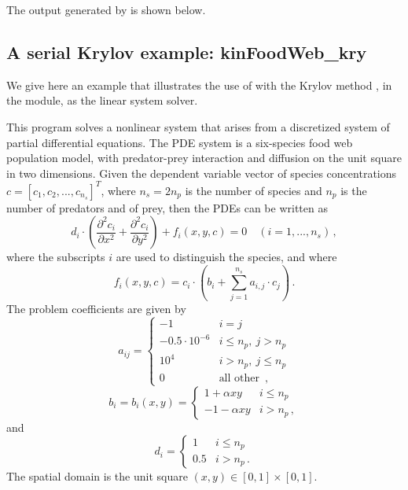 The output generated by  is shown below.




\subsection{A serial Krylov example: kinFoodWeb\_kry}\label{ss:kinFoodWeb_kry}

We give here an example that illustrates the use of {\kinsol} with the Krylov
method {\spgmr}, in the {\kinspgmr} module, as the linear system solver.

This program solves a nonlinear system that arises from a discretized system of partial
differential equations. The PDE system is a six-species food web population
model, with predator-prey interaction and diffusion on the unit square in
two dimensions. Given the dependent variable vector of species concentrations
$c = [c_1, c_2,..., c_{n_s}]^T$, where $n_s = 2 n_p$ is the number of species 
and $n_p$ is the number of predators and of prey, then
the PDEs can be written as
\begin{equation}\label{e:kinFoodWeb_kry_pde}
  d_i \cdot \left( \frac{\partial^2 c_i}{\partial x^2} + 
    \frac{\partial^2 c_i}{\partial y^2} \right) + f_i(x,y,c) = 0
  \quad (i=1,...,n_s) \, ,
\end{equation}
where the subscripts $i$ are used to distinguish the species, and where
\begin{equation}\label{e:kinFoodWeb_kry_fterm}
f_i(x,y,c) = c_i \cdot \left(b_i + \sum_{j=1}^{n_s} a_{i,j} \cdot c_j \right) \, .
\end{equation}
The problem coefficients are given by
\begin{equation*}
  a_{ij} = 
  \begin{cases}
    -1                 & i=j \\
    -0.5 \cdot 10^{-6} & i \leq n_p , ~ j > n_p  \\
    10^4               & i > n_p , ~ j \leq n_p  \\
    0                  & \mbox{all other } \, ,
  \end{cases}
\end{equation*}
\begin{equation*}
  b_i = b_i(x,y) = 
  \begin{cases}
    1 + \alpha xy   & i \leq n_p  \\
    -1 - \alpha xy   & i > n_p \, ,
  \end{cases}
\end{equation*}
and
\begin{equation*}
  d_i = 
  \begin{cases}
    1 & i \leq n_p  \\
    0.5 & i > n_p  \, .
  \end{cases}
\end{equation*}
The spatial domain is the unit square $(x,y) \in [0,1] \times [0,1]$.

